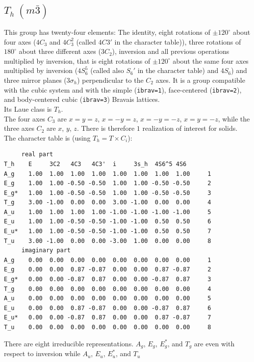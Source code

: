 \documentclass[12pt,a4paper]{article}
\begin{document}
\subsection{\color{web-blue}$T_h\ (m\bar 3)$}
This group has twenty-four elements: The identity, eight rotations 
of $\pm120^\circ$ about four axes ($4C_3$ and $4C_3^2$ (called $4C3'$ in the 
character table)), three rotations of $180^\circ$ about three different axes 
($3C_2$), inversion and all previous operations multiplied by inversion, that is
eight rotations of $\pm120^\circ$ about the same four axes multiplied by inversion
($4S_6^5$ (called also $S_6'$ in the character table) and $4S_6$) and three 
mirror planes ($3\sigma_h$) perpendicular to the $C_2$ axes.
It is a group compatible with the cubic system and with the  
simple (\texttt{ibrav=1}), face-centered (\texttt{ibrav=2}), 
and body-centered cubic (\texttt{ibrav=3}) Bravais lattices. \\
Its Laue class is $T_{h}$. \\
The four axes $C_3$ are $x=y=z$, $x=-y=z$, $x=-y=-z$, $x=y=-z$, while
the three axes $C_2$ are $x$, $y$, $z$. There is therefore $1$
realization of interest for solids. \\
The character table is (using $T_h= T \times C_i$):
\begin{verbatim}
     real part
T_h    E     3C2   4C3   4C3'  i     3s_h  4S6^5 4S6  
A_g    1.00  1.00  1.00  1.00  1.00  1.00  1.00  1.00     1
E_g    1.00  1.00 -0.50 -0.50  1.00  1.00 -0.50 -0.50     2
E_g*   1.00  1.00 -0.50 -0.50  1.00  1.00 -0.50 -0.50     3
T_g    3.00 -1.00  0.00  0.00  3.00 -1.00  0.00  0.00     4
A_u    1.00  1.00  1.00  1.00 -1.00 -1.00 -1.00 -1.00     5
E_u    1.00  1.00 -0.50 -0.50 -1.00 -1.00  0.50  0.50     6
E_u*   1.00  1.00 -0.50 -0.50 -1.00 -1.00  0.50  0.50     7
T_u    3.00 -1.00  0.00  0.00 -3.00  1.00  0.00  0.00     8
     imaginary part
A_g    0.00  0.00  0.00  0.00  0.00  0.00  0.00  0.00     1
E_g    0.00  0.00  0.87 -0.87  0.00  0.00  0.87 -0.87     2
E_g*   0.00  0.00 -0.87  0.87  0.00  0.00 -0.87  0.87     3
T_g    0.00  0.00  0.00  0.00  0.00  0.00  0.00  0.00     4
A_u    0.00  0.00  0.00  0.00  0.00  0.00  0.00  0.00     5
E_u    0.00  0.00  0.87 -0.87  0.00  0.00 -0.87  0.87     6
E_u*   0.00  0.00 -0.87  0.87  0.00  0.00  0.87 -0.87     7
T_u    0.00  0.00  0.00  0.00  0.00  0.00  0.00  0.00     8
\end{verbatim}
There are eight irreducible representations. $A_g$, $E_g$, $E_g^*$, and $T_g$
are even with respect to inversion while $A_u$, $E_u$, $E_u^*$, and $T_u$
\end{document}
